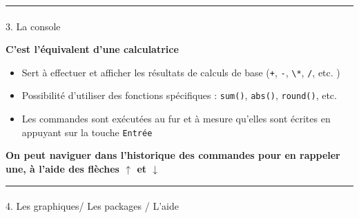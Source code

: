 \documentclass[
  french,
  10pt,
  a4paper,
]{article}
\makeatletter
\let\oldparagraph\paragraph
\renewcommand{\paragraph}{
    \@ifstar
      \xxxParagraphStar
      \xxxParagraphNoStar
  }
\newcommand{\xxxParagraphStar}[1]{\oldparagraph*{#1}\mbox{}}
\newcommand{\xxxParagraphNoStar}[1]{\oldparagraph{#1}\mbox{}}
\providecommand{\tightlist}{%
  \setlength{\itemsep}{0pt}\setlength{\parskip}{0pt}}
\makeatother
\begin{document}
\begin{center}\rule{0.5\linewidth}{0.5pt}\end{center}

\paragraph{3. La console}\label{la-console}

\textbf{C'est l'équivalent d'une calculatrice}

\begin{itemize}
\tightlist
\item
  Sert à effectuer et afficher les résultats de calculs de base
  (\texttt{+}, \texttt{-}, \texttt{\textbackslash{}*}, \texttt{/}, etc.
  )
\item
  Possibilité d'utiliser des fonctions spécifiques : \texttt{sum()},
  \texttt{abs()}, \texttt{round()}, etc.
\item
  Les commandes sont exécutées au fur et à mesure qu'elles sont écrites
  en appuyant sur la touche \texttt{Entrée}
\end{itemize}

\begin{tcolorbox}[enhanced jigsaw, arc=.35mm, bottomrule=.15mm, bottomtitle=1mm, breakable, colback=white, colbacktitle=quarto-callout-tip-color!10!white, colframe=quarto-callout-tip-color-frame, coltitle=black, left=2mm, leftrule=.75mm, opacityback=0, opacitybacktitle=0.6, rightrule=.15mm, title=\textcolor{quarto-callout-tip-color}{\faLightbulb}\hspace{0.5em}{Astuce}, titlerule=0mm, toprule=.15mm, toptitle=1mm]

\textbf{On peut naviguer dans l'historique des commandes pour en
rappeler une, à l'aide des flèches \(\uparrow\) et \(\downarrow\)}

\end{tcolorbox}

\begin{center}\rule{0.5\linewidth}{0.5pt}\end{center}

\paragraph{4. Les graphiques/ Les packages /
L'aide}\label{les-graphiques-les-packages-laide}
\end{document}
